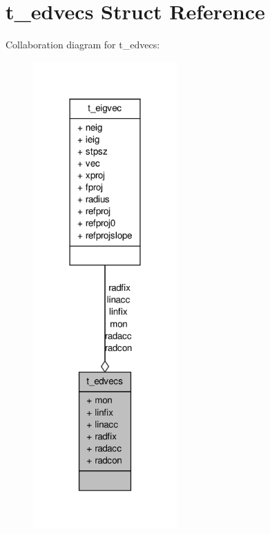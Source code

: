 \hypertarget{structt__edvecs}{\section{t\-\_\-edvecs \-Struct \-Reference}
\label{structt__edvecs}
}


\-Collaboration diagram for t\-\_\-edvecs\-:
\nopagebreak
\begin{figure}[H]
\begin{center}
\leavevmode
\includegraphics[width=156pt]{structt__edvecs__coll__graph}
\end{center}
\end{figure}
